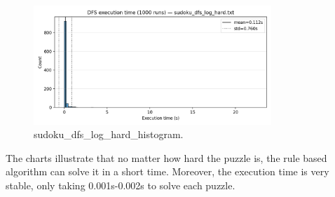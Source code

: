 \begin{figure}[H]
\centering
\includegraphics[width=0.8\textwidth]{resources/sudoku_dfs_log_hard_histogram.png}
\caption{sudoku\_dfs\_log\_hard\_histogram.}
\label{fig:sudoku_dfs_log_hard_histogram}
\end{figure}

The charts illustrate that no matter how hard the puzzle is, the rule based algorithm can solve it in a short time. Moreover, the execution time is very stable, only taking 0.001s-0.002s to solve each puzzle.
